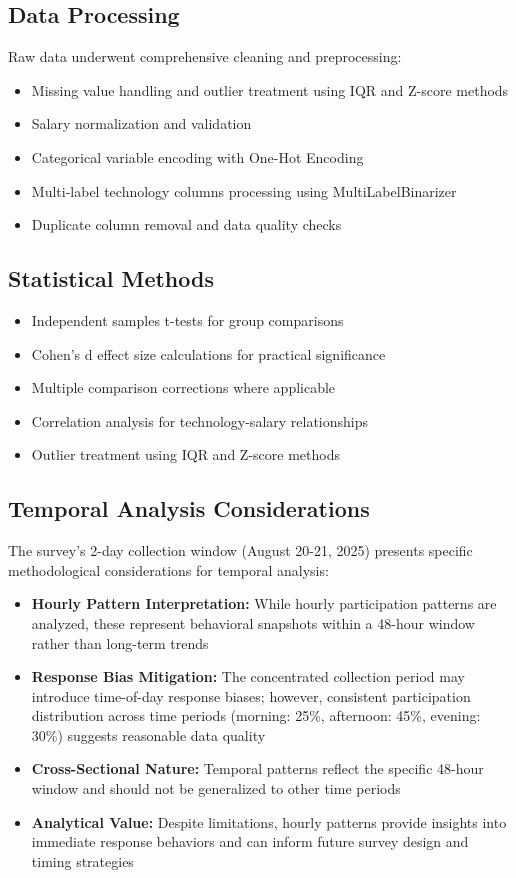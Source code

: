\documentclass[12pt,a4paper]{article}
\begin{document}
\subsection{Data Processing}
Raw data underwent comprehensive cleaning and preprocessing:
\begin{itemize}
    \item Missing value handling and outlier treatment using IQR and Z-score methods
    \item Salary normalization and validation
    \item Categorical variable encoding with One-Hot Encoding
    \item Multi-label technology columns processing using MultiLabelBinarizer
    \item Duplicate column removal and data quality checks
\end{itemize}

\subsection{Statistical Methods}
\begin{itemize}
    \item Independent samples t-tests for group comparisons
    \item Cohen's d effect size calculations for practical significance
    \item Multiple comparison corrections where applicable
    \item Correlation analysis for technology-salary relationships
    \item Outlier treatment using IQR and Z-score methods
\end{itemize}

\subsection{Temporal Analysis Considerations}
The survey's 2-day collection window (August 20-21, 2025) presents specific methodological considerations for temporal analysis:

\begin{itemize}
    \item \textbf{Hourly Pattern Interpretation:} While hourly participation patterns are analyzed, these represent behavioral snapshots within a 48-hour window rather than long-term trends
    \item \textbf{Response Bias Mitigation:} The concentrated collection period may introduce time-of-day response biases; however, consistent participation distribution across time periods (morning: 25\%, afternoon: 45\%, evening: 30\%) suggests reasonable data quality
    \item \textbf{Cross-Sectional Nature:} Temporal patterns reflect the specific 48-hour window and should not be generalized to other time periods
    \item \textbf{Analytical Value:} Despite limitations, hourly patterns provide insights into immediate response behaviors and can inform future survey design and timing strategies
\end{itemize}
\end{document}
